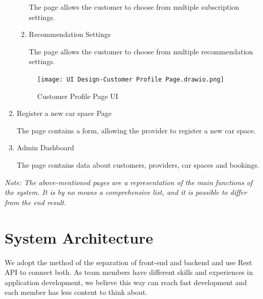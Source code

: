 \documentclass[12pt]{article}
\begin{document}
\begin{enumerate}
\begin{enumerate}
          The page allows the customer to choose from multiple subscription settings.       
  
  
          \item     
          \begin{description}
            \item[Recommendation Settings]
          \end{description}
  
          The page allows the customer to choose from multiple recommendation settings.    
  
        \end{enumerate}
  
        \begin{figure}[htp]
          \centering
        \texttt{[image: UI Design-Customer Profile Page.drawio.png]}
        
        \caption{Customer Profile Page UI}
        \end{figure}

      \item
      \begin{description}
        \item[Register a new car space Page]
      \end{description}

      The page contains a form, allowing the provider to register a new car space.

      \item
      \begin{description}
        \item[Admin Dashboard]
      \end{description}

      The page contains data about customers, providers, car spaces and bookings.

  \end{enumerate}

\textit{Note: The above-mentioned pages are a representation of the main functions of the system. It is by no means a comprehensive list, and it is possible to differ from the end result.}

\section{System Architecture}

  We adopt the method of the separation of front-end and backend and use Rest API to connect both. As team members have different skills and experiences in application development, we believe this way can reach fast development and each member has less content to think about.
\end{document}
